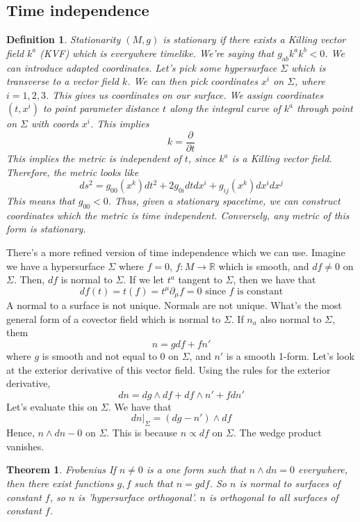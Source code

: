 \documentclass[11pt, oneside]{article}   	%
\theoremstyle{slanted}
\newtheorem*{thm}{Theorem}
\newtheorem*{defn}{Definition}
\begin{document}
\subsection{Time independence}
\begin{defn}{Stationarity}
	$ \left(  M , g  \right)  $ is stationary if there exists a Killing vector field
	$ k ^ a $
	(KVF) which is everywhere timelike. 
	We're saying that $ g _{ ab } k ^ a k ^ b < 0 $. We can introduce adapted coordinates. 
	Let's pick some hypersurface $ \Sigma $ which is transverse to a vector field 
	$ k $. We can then pick coordinates  $ x ^ i $ on $ \Sigma $, where $ i =  1, 2, 3 $. 
	This gives us coordinates on our surface. 
	We assign coordinates $ \left(  t, x ^ i  \right)  $ to point parameter 
	distance $ t $ along the integral curve of  $ k ^ a $ through point on 
	$ \Sigma $ with coords $ x ^ i $. This implies 
	\[
	 k  = \frac{\partial }{\partial t} 
	\] This implies the metric is independent of $ t $, since $ k ^ a $ is a 
	Killing vector field. Therefore, the metric looks like 
	\[
		ds ^ 2  = g _{ 00 } \left( x ^ k  \right) dt ^ 2  + 2 
		g _{ 0i } dt d x ^ i + g _{ ij  }\left( x ^ k  \right)  dx ^ i dx ^ j 
	\] This means that $ g _{ 00 } < 0 $. Thus, 
	given a stationary spacetime, we can construct coordinates which 
	the metric is time independent. 
	Conversely, any metric of this form is stationary. 
\end{defn}
There's a more refined version of time independence which 
we can use. 
Imagine we have a hypersurface $ \Sigma $ where $ f = 0 $, $ f : M \to \mathbb{ R } $
which is smooth, and $ df \neq 0  $ on $ \Sigma $. 
Then, $ df $ is normal to $ \Sigma $. 
If we let $ t ^ a $ tangent to $ \Sigma $, then we have that 
\[
 df ( t )  = t ( f )  = t ^ \mu \partial  _ \mu f = 0 \text{ since } f  \text{ is constant}
\] A normal to a surface is 
not unique. 
Normals are not unique. What's the most general 
form of a covector field which is normal to $ \Sigma $. 
If $ n _ a$  also normal to $ \Sigma $, them 
\[
 n = g df + f n ' 
\] where $ g $ is smooth and not equal to $ 0 $ on $ \Sigma $,
and  $ n ' $ is a smooth 1-form. 
Let's look at the exterior 
derivative of this vector field. Using the rules 
for the exterior derivative, 
\[
 dn = dg \wedge  df + df \wedge  n ' + f dn ' 
\] Let's evaluate this 
on $ \Sigma $. We have that 
\[
	\left. dn \right\vert_{ \Sigma }  = \left(  dg - n '  \right)  \wedge  df
\] Hence, $ n \wedge  dn - 0 $   on $ \Sigma $. This is because 
$ n \propto df $ on $ \Sigma $. The wedge product vanishes. 
\begin{thm}{Frobenius}
	If $ n \neq 0 $ is a one form such that $ n \wedge  dn  = 0 $  everywhere, 
	then there exist functions $g, f $ such that 
	$ n   = g df $. So $ n $ is normal 
	to surfaces of constant $ f $, so 
	$ n $ is 'hypersurface orthogonal'. 
	$ n$ is orthogonal to all surfaces 
	of constant $ f $. 
\end{thm}
\end{document}
